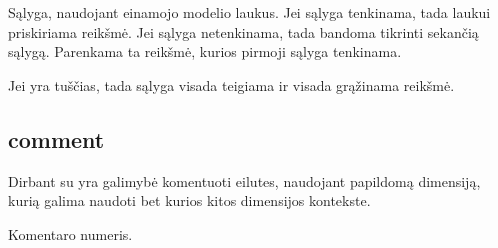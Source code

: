 \documentclass[letterpaper,10pt,lithuanian]{sphinxmanual}
\begin{document}
\begin{fulllineitems}
\label{\detokenize{dimensijos:switch.switch.prepare}}
\pysigstartsignatures
\pysigline
{}
\pysigstopsignatures
\sphinxAtStartPar
Sąlyga, naudojant einamojo modelio laukus. Jei sąlyga tenkinama, tada
laukui priskiriama {\hyperref[\detokenize{dimensijos:switch.switch.source}]{}} reikšmė. Jei sąlyga
netenkinama, tada bandoma tikrinti sekančią sąlygą. Parenkama ta
reikšmė, kurios pirmoji sąlyga tenkinama.

\sphinxAtStartPar
Jei {\hyperref[\detokenize{dimensijos:switch.switch.prepare}]{}} yra tuščias, tada sąlyga visada teigiama ir
visada grąžinama {\hyperref[\detokenize{dimensijos:switch.switch.source}]{}} reikšmė.

\end{fulllineitems}



\subsection{comment}
\label{\detokenize{dimensijos:comment}}\label{\detokenize{dimensijos:id14}}\label{\detokenize{dimensijos:module-comment}}
\sphinxAtStartPar
Dirbant su {\hyperref[\detokenize{savokos:term-DSA}]{}} yra galimybė komentuoti eilutes, naudojant papildomą
{\hyperref[\detokenize{dimensijos:module-comment}]{}} dimensiją, kurią galima naudoti bet kurios kitos dimensijos
kontekste.

\begin{fulllineitems}
\label{\detokenize{dimensijos:comment.id}}
\pysigstartsignatures
\pysigline
{}
\pysigstopsignatures
\sphinxAtStartPar
Komentaro numeris.

\end{fulllineitems}

\end{document}
